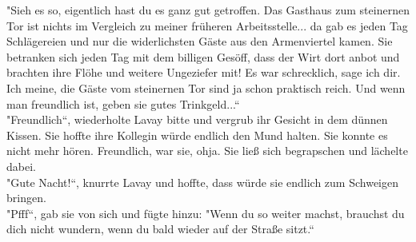 "Sieh es so, eigentlich hast du es ganz gut getroffen. Das Gasthaus zum steinernen Tor ist nichts 
im Vergleich zu meiner früheren Arbeitsstelle... da gab es jeden Tag Schlägereien und nur die 
widerlichsten Gäste aus den Armenviertel kamen. Sie betranken sich jeden Tag mit dem billigen 
Gesöff, dass der Wirt dort anbot und brachten ihre Flöhe und weitere Ungeziefer mit! Es war 
schrecklich, sage ich dir. Ich meine, die Gäste vom steinernen Tor sind ja schon praktisch reich. 
Und wenn man freundlich ist, geben sie gutes Trinkgeld...``\\
"Freundlich``, wiederholte Lavay bitte und vergrub ihr Gesicht in dem dünnen Kissen. Sie hoffte 
ihre Kollegin würde endlich den Mund halten. Sie konnte es nicht mehr hören. Freundlich, war sie, 
ohja. Sie ließ sich begrapschen und lächelte dabei.\\
"Gute Nacht!``, knurrte Lavay und hoffte, dass würde sie endlich zum Schweigen bringen.\\
"Pfff``, gab sie von sich und fügte hinzu: "Wenn du so weiter machst, brauchst du dich nicht 
wundern, wenn du bald wieder auf der Straße sitzt.``\\

